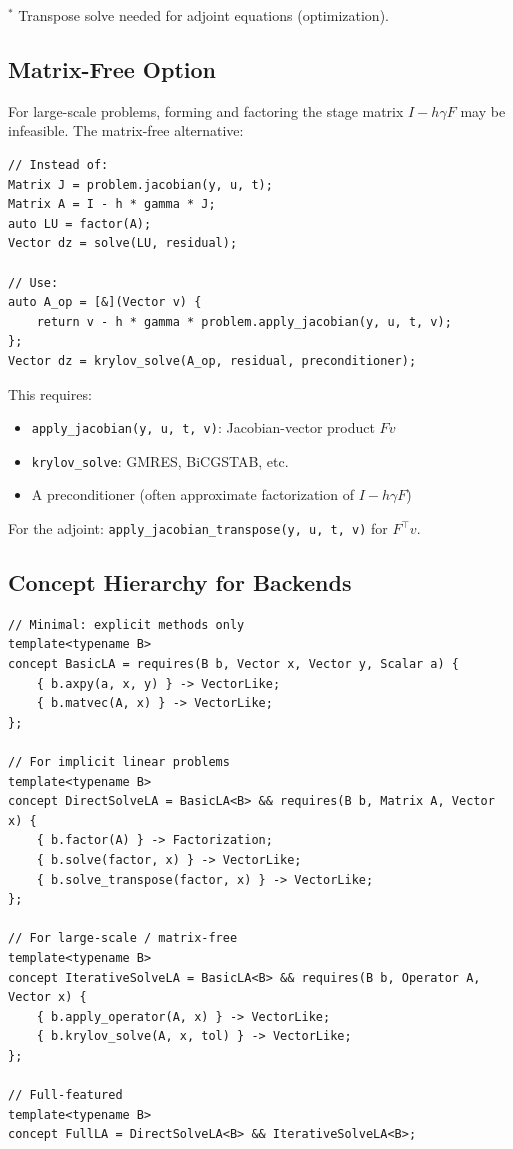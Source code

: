 \documentclass[11pt]{article}
\begin{document}
$^*$ Transpose solve needed for adjoint equations (optimization).

\subsection{Matrix-Free Option}

For large-scale problems, forming and factoring the stage matrix $I - h\gamma F$ may be infeasible. The matrix-free alternative:

\begin{verbatim}
// Instead of:
Matrix J = problem.jacobian(y, u, t);
Matrix A = I - h * gamma * J;
auto LU = factor(A);
Vector dz = solve(LU, residual);

// Use:
auto A_op = [&](Vector v) { 
    return v - h * gamma * problem.apply_jacobian(y, u, t, v);
};
Vector dz = krylov_solve(A_op, residual, preconditioner);
\end{verbatim}

This requires:
\begin{itemize}[nosep]
\item \texttt{apply\_jacobian(y, u, t, v)}: Jacobian-vector product $Fv$
\item \texttt{krylov\_solve}: GMRES, BiCGSTAB, etc.
\item A preconditioner (often approximate factorization of $I - h\gamma F$)
\end{itemize}

For the adjoint: \texttt{apply\_jacobian\_transpose(y, u, t, v)} for $F^\top v$.

\subsection{Concept Hierarchy for Backends}

\begin{verbatim}
// Minimal: explicit methods only
template<typename B>
concept BasicLA = requires(B b, Vector x, Vector y, Scalar a) {
    { b.axpy(a, x, y) } -> VectorLike;
    { b.matvec(A, x) } -> VectorLike;
};

// For implicit linear problems
template<typename B>
concept DirectSolveLA = BasicLA<B> && requires(B b, Matrix A, Vector x) {
    { b.factor(A) } -> Factorization;
    { b.solve(factor, x) } -> VectorLike;
    { b.solve_transpose(factor, x) } -> VectorLike;
};

// For large-scale / matrix-free
template<typename B>
concept IterativeSolveLA = BasicLA<B> && requires(B b, Operator A, Vector x) {
    { b.apply_operator(A, x) } -> VectorLike;
    { b.krylov_solve(A, x, tol) } -> VectorLike;
};

// Full-featured
template<typename B>
concept FullLA = DirectSolveLA<B> && IterativeSolveLA<B>;
\end{verbatim}
\end{document}
